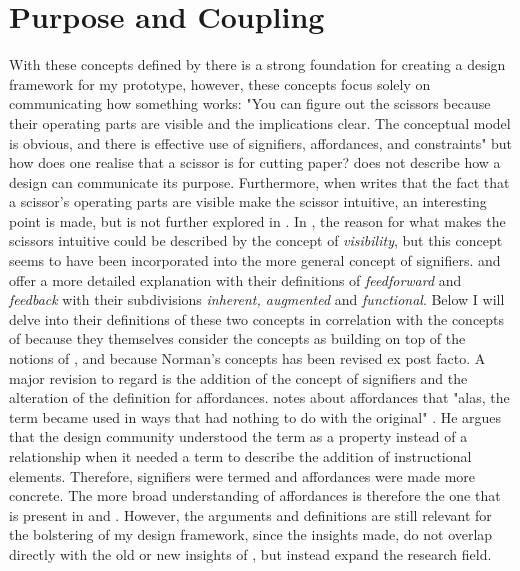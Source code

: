 \section{Purpose and Coupling}
With these concepts defined by  there is a strong foundation for creating a design framework for my prototype, however, these concepts focus solely on communicating how something works: "You can figure out the scissors because their operating parts are visible and the implications clear. The conceptual model is obvious, and there is effective use of signifiers, affordances, and constraints" \cite[p. 27]{norman} but how does one realise that a scissor is for cutting paper?  does not describe how a design can communicate its purpose. Furthermore, when  writes that the fact that a scissor's operating parts are visible make the scissor intuitive, an interesting point is made, but is not further explored in . In , the reason for what makes the scissors intuitive could be described by the concept of \textit{visibility}, but this concept seems to have been incorporated into the more general concept of signifiers.  and  offer a more detailed explanation with their definitions of \textit{feedforward} and \textit{feedback} with their subdivisions \textit{inherent, augmented} and \textit{functional}. Below I will delve into their definitions of these two concepts in correlation with the concepts of  because they themselves consider the concepts as building on top of the notions of , and because Norman's concepts has been revised \cite{norman} ex post facto. A major revision to regard is the addition of the concept of signifiers and the alteration of the definition for affordances.  notes about affordances that "alas, the term became used in ways that had nothing to do with the original" \cite[p. 13]{norman}. He argues that the design community understood the term as a property instead of a relationship when it needed a term to describe the addition of instructional elements. Therefore, signifiers were termed and affordances were made more concrete. The more broad understanding of affordances is therefore the one that is present in  and . However, the arguments and definitions are still relevant for the bolstering of my design framework, since the insights made, do not overlap directly with the old or new insights of , but instead expand the research field.


